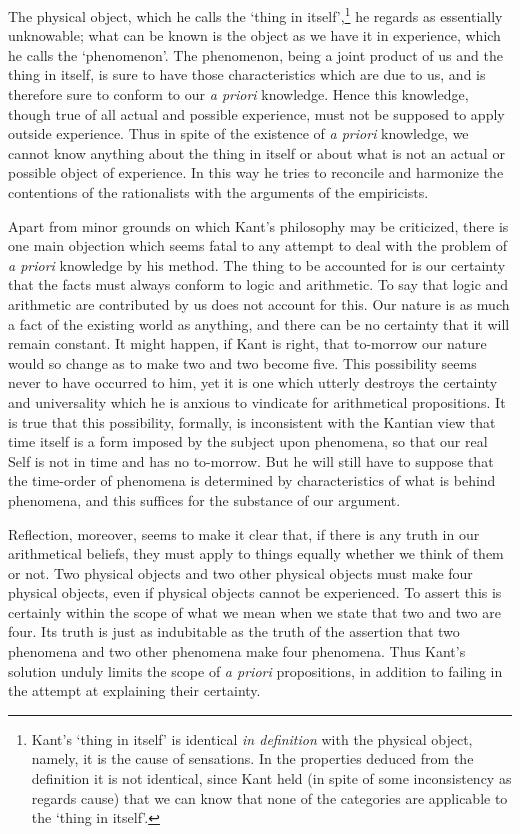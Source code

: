\documentclass[oneside,letterpaper,12pt]{book}
\begin{document}
The physical object, which he calls the `thing in
itself',\footnote{Kant's `thing in
	itself' is identical \emph{in definition} with the
	physical object, namely, it is the cause of sensations. In the
	properties deduced from the definition it is not identical, since Kant
	held (in spite of some inconsistency as regards cause) that we can know
	that none of the categories are applicable to the `thing
	in itself'.} he regards as essentially unknowable; what
can be known is the object as we have it in experience, which he calls
the `phenomenon'. The phenomenon, being a
joint product of us and the thing in itself, is sure to have those
characteristics which are due to us, and is therefore sure to conform to
our \emph{a priori} knowledge. Hence this knowledge, though true of all
actual and possible experience, must not be supposed to apply outside
experience. Thus in spite of the existence of \emph{a priori} knowledge,
we cannot know anything about the thing in itself or about what is not
an actual or possible object of experience. In this way he tries to
reconcile and harmonize the contentions of the rationalists with the
arguments of the empiricists.

Apart from minor grounds on which Kant's philosophy may
be criticized, there is one main objection which seems fatal to any
attempt to deal with the problem of \emph{a priori} knowledge by his
method. \label{certainty} The thing to be accounted for is our certainty that the facts
must always conform to logic and arithmetic. To say that logic and
arithmetic are contributed by us does not account for this. Our nature
is as much a fact of the existing world as anything, and there can be no
certainty that it will remain constant. It might happen, if Kant is
right, that to-morrow our nature would so change as to make two and two
become five. This possibility seems never to have occurred to him, yet
it is one which utterly destroys the certainty and universality which he
is anxious to vindicate for arithmetical propositions. It is true that
this possibility, formally, is inconsistent with the Kantian view that
time itself is a form imposed by the subject upon phenomena, so that our
real Self is not in time and has no to-morrow. But he will still have to
suppose that the time-order of phenomena is determined by
characteristics of what is behind phenomena, and this suffices for the
substance of our argument.

Reflection, moreover, seems to make it clear that, if there is any truth
in our arithmetical beliefs, they must apply to things equally whether
we think of them or not. Two physical objects and two other physical
objects must make four physical objects, even if physical objects cannot
be experienced. To assert this is certainly within the scope of what we
mean when we state that two and two are four. Its truth is just as
indubitable as the truth of the assertion that two phenomena and two
other phenomena make four phenomena. Thus Kant's
solution unduly limits the scope of \emph{a priori} propositions, in
addition to failing in the attempt at explaining their certainty.
\end{document}
